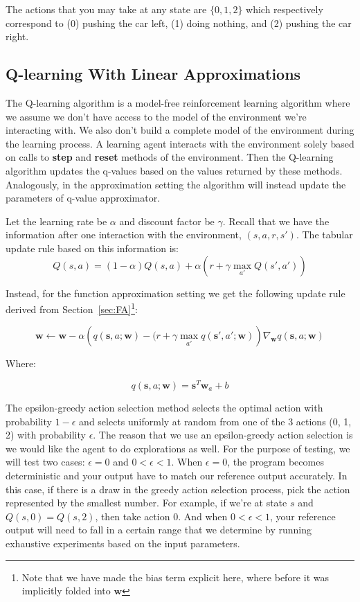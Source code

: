 \documentclass[11pt]{article}
\numberwithin{equation}{section} %
\numberwithin{figure}{section} %
\numberwithin{table}{section} %
\newcommand{\sv}{\mathbf{s}}
\newcommand{\wv}{\mathbf{w}}
\begin{document}
The actions that you may take at any state are $\{0, 1, 2\}$ which respectively correspond to (0) pushing the car left, (1) doing nothing, and (2) pushing the car right.

\subsection{Q-learning With Linear Approximations}
The Q-learning algorithm is a model-free reinforcement learning algorithm where we assume we don't have access to the model of the environment we're interacting with. We also don't build a complete model of the environment during the learning process. A learning agent interacts with the environment solely based on calls to \textbf{step} and \textbf{reset} methods of the environment. Then the Q-learning algorithm updates the q-values based on the values returned by these methods. Analogously, in the approximation setting the algorithm will instead update the parameters of q-value approximator.


Let the learning rate be $\alpha$ and discount factor be $\gamma$. Recall that we have the information after one interaction with the environment, $(s, a, r, s')$. The tabular update rule based on this information is: 
\[
    Q(s,a) = (1 - \alpha) Q(s, a) + \alpha \left(r + \gamma \max_{a'} Q(s', a')\right)
\]

Instead, for the function approximation setting we get the following update rule derived from Section~\ref{sec:FA}\footnote{Note that we have made the bias term explicit here, where before it was implicitly folded into $\wv$ }:

\[
\wv \leftarrow \wv - \alpha \left(q(\sv, a; \wv) - (r + \gamma \max_{a'} q(\sv', a'; \wv)\right) \nabla_\wv q(\sv, a; \wv)
\]

Where:

\[
q(\sv,a;\wv) = \sv^T \wv_a + b
\]

The epsilon-greedy action selection method selects the optimal action with probability $1 - \epsilon$ and selects uniformly at random from one of the 3 actions (0, 1, 2) with probability $\epsilon$. The reason that we use an epsilon-greedy action selection is we would like the agent to do explorations as well. For the purpose of testing, we will test two cases: $\epsilon = 0$ and $0 < \epsilon < 1$. When $\epsilon = 0$, the program becomes deterministic and your output have to match our reference output accurately. In this case, if there is a draw in the greedy action selection process, pick the action represented by the smallest number. For example, if we're at state $s$ and $Q(s, 0) = Q(s, 2)$, then take action $0$. And when $0 < \epsilon < 1$, your reference output will need to fall in a certain range that we determine by running exhaustive experiments based on the input parameters.
\end{document}
